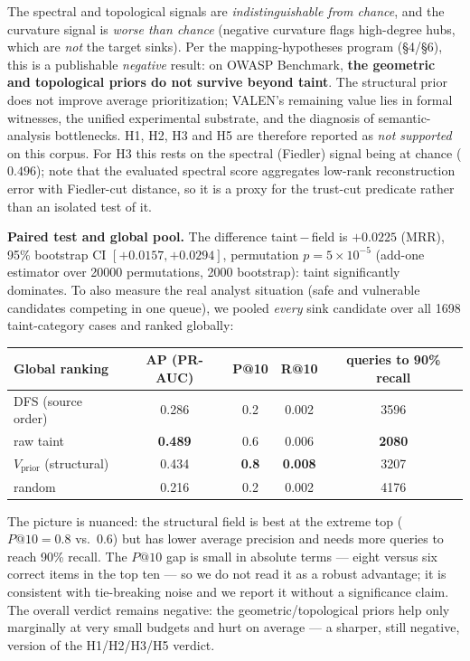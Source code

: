 \documentclass[11pt]{article}
\begin{document}
The spectral and topological signals are \emph{indistinguishable from chance},
and the curvature signal is \emph{worse than chance} (negative curvature flags
high-degree hubs, which are \emph{not} the target sinks). Per the
mapping-hypotheses program (§4/§6), this is a publishable \emph{negative} result:
on OWASP Benchmark, \textbf{the geometric and topological priors do not survive
beyond taint}. The structural prior does not improve average prioritization;
VALEN's remaining value lies in formal witnesses, the unified experimental
substrate, and the diagnosis of semantic-analysis bottlenecks. H1, H2, H3 and H5
are therefore reported as \emph{not supported} on this corpus. For H3 this rests
on the spectral (Fiedler) signal being at chance ($0.496$); note that the
evaluated spectral score aggregates low-rank reconstruction error with Fiedler-cut
distance, so it is a proxy for the trust-cut predicate rather than an isolated
test of it.

\noindent\textbf{Paired test and global pool.} The difference taint\,$-$\,field is
$+0.0225$ (MRR), 95\% bootstrap CI $[+0.0157,+0.0294]$, permutation $p=5\times10^{-5}$ (add-one estimator over 20000 permutations, 2000 bootstrap):
taint significantly dominates. To also measure the real analyst situation (safe
and vulnerable candidates competing in one queue), we pooled \emph{every} sink
candidate over all 1698 taint-category cases and ranked globally:

\begin{center}
\small
\begin{tabular}{lcccc}
\toprule
Global ranking & AP (PR-AUC) & P@10 & R@10 & queries to 90\% recall \\
\midrule
DFS (source order) & 0.286 & 0.2 & 0.002 & 3596 \\
raw taint & \textbf{0.489} & 0.6 & 0.006 & \textbf{2080} \\
$V_{\text{prior}}$ (structural) & 0.434 & \textbf{0.8} & \textbf{0.008} & 3207 \\
random & 0.216 & 0.2 & 0.002 & 4176 \\
\bottomrule
\end{tabular}
\end{center}

The picture is nuanced: the structural field is best at the extreme top
($P@10=0.8$ vs.\ $0.6$) but has lower average precision and needs more queries to
reach 90\% recall. The $P@10$ gap is small in absolute terms --- eight versus six
correct items in the top ten --- so we do not read it as a robust advantage; it is
consistent with tie-breaking noise and we report it without a significance claim.
The overall verdict remains negative: the geometric/topological priors help only
marginally at very small budgets and hurt on average --- a sharper, still
negative, version of the H1/H2/H3/H5 verdict.
\end{document}
